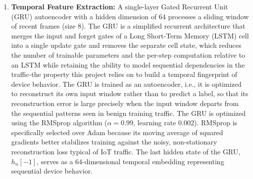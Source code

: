 \begin{enumerate}
	\item \textbf{Temporal Feature Extraction:} A single-layer Gated Recurrent Unit (GRU) autoencoder \cite{Cho2014} with a hidden dimension of 64 processes a sliding window of recent frames (size 8). The GRU is a simplified recurrent architecture that merges the input and forget gates of a Long Short-Term Memory (LSTM) cell into a single update gate and removes the separate cell state, which reduces the number of trainable parameters and the per-step computation relative to an LSTM while retaining the ability to model sequential dependencies in the traffic-the property this project relies on to build a temporal fingerprint of device behavior. The GRU is trained as an autoencoder, i.e., it is optimized to reconstruct its own input window rather than to predict a label, so that its reconstruction error is large precisely when the input window departs from the sequential patterns seen in benign training traffic. The GRU is optimized using the RMSprop algorithm \cite{Tieleman2012} ($\alpha=0.99$, learning rate $0.002$). RMSprop is specifically selected over Adam because its moving average of squared gradients better stabilizes training against the noisy, non-stationary reconstruction loss typical of IoT traffic. The last hidden state of the GRU, $h_n[-1]$, serves as a 64-dimensional temporal embedding representing sequential device behavior.


\end{enumerate}
